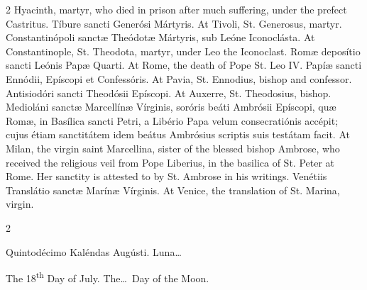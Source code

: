 \begin{paracol}{2}
 Hyacinth, martyr, who died in prison after much suffering, under the prefect 
 Castritus.
\switchcolumn*
{}
Tíbure sancti Generósi 
 Mártyris.
\switchcolumn
{}
At Tivoli, St. Generosus, martyr.
\switchcolumn*
{}
Constantinópoli sanctæ 
 Theódotæ Mártyris, sub Leóne Iconoclásta.
\switchcolumn
{}
At Constantinople, St. Theodota, 
 martyr, under Leo the Iconoclast.
\switchcolumn*
{}
Romæ deposítio sancti 
 Leónis Papæ Quarti.
\switchcolumn
{}
At Rome, the death of Pope St. Leo 
 IV.
\switchcolumn*
{}
Papíæ sancti Ennódii, 
 Epíscopi et Confessóris.
\switchcolumn
{}
At Pavia, St. Ennodius, bishop and 
 confessor.
\switchcolumn*
{}
Antisiodóri sancti 
 Theodósii Epíscopi.
\switchcolumn
{}
At Auxerre, St. Theodosius, bishop.
\switchcolumn*
{}
Medioláni sanctæ 
 Marcellínæ Vírginis, soróris beáti Ambrósii Epíscopi, quæ Romæ, in Basílica 
 sancti Petri, a Libério Papa velum consecratiónis accépit; cujus étiam 
 sanctitátem idem beátus Ambrósius scriptis suis testátam facit.
\switchcolumn
{}
At Milan, the virgin saint 
 Marcellina, sister of the blessed bishop Ambrose, who received the religious 
 veil from Pope Liberius, in the basilica of St. Peter at Rome. Her 
 sanctity is attested to by St. Ambrose in his writings.
\switchcolumn*
{}
Venétiis Translátio 
 sanctæ Marínæ Vírginis.
\switchcolumn
{}
At Venice, the translation of St. 
 Marina, virgin.
\switchcolumn*
{}
\end{paracol}


\begin{paracol}{2}
\begin{center}{\color{gregoriocolor} Quintodécimo Kaléndas Augústi. 
 Luna\dots\ }\end{center}
\switchcolumn
{}
\begin{center}{\color{gregoriocolor} The 
 18\textsuperscript{th} Day of 
 July. The\dots\ Day of the Moon.}\end{center}
\end{paracol}

